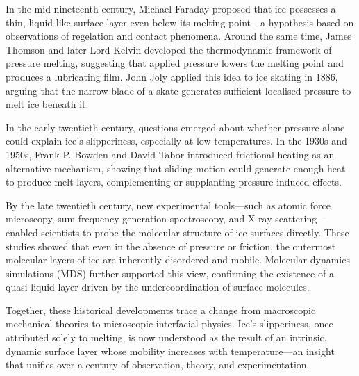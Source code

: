 \begin{historical}
In the mid-nineteenth century, Michael Faraday proposed that ice possesses a thin, liquid-like surface layer even below its melting point—a hypothesis based on observations of regelation and contact phenomena. Around the same time, James Thomson and later Lord Kelvin developed the thermodynamic framework of pressure melting, suggesting that applied pressure lowers the melting point and produces a lubricating film. John Joly applied this idea to ice skating in 1886, arguing that the narrow blade of a skate generates sufficient localised pressure to melt ice beneath it.

In the early twentieth century, questions emerged about whether pressure alone could explain ice's slipperiness, especially at low temperatures. In the 1930s and 1950s, Frank P. Bowden and David Tabor introduced frictional heating as an alternative mechanism, showing that sliding motion could generate enough heat to produce melt layers, complementing or supplanting pressure-induced effects.

By the late twentieth century, new experimental tools—such as atomic force microscopy, sum-frequency generation spectroscopy, and X-ray scattering—enabled scientists to probe the molecular structure of ice surfaces directly. These studies showed that even in the absence of pressure or friction, the outermost molecular layers of ice are inherently disordered and mobile. Molecular dynamics simulations (MDS) further supported this view, confirming the existence of a quasi-liquid layer driven by the undercoordination of surface molecules.

Together, these historical developments trace a change from macroscopic mechanical theories to microscopic interfacial physics. Ice’s slipperiness, once attributed solely to melting, is now understood as the result of an intrinsic, dynamic surface layer whose mobility increases with temperature—an insight that unifies over a century of observation, theory, and experimentation.
\end{historical}
